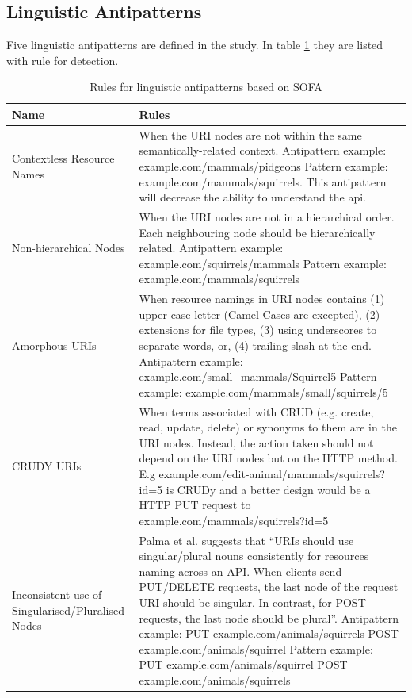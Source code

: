 \documentclass[a4paper,12pt]{article}
\begin{document}
\subsection{Linguistic Antipatterns}

Five linguistic antipatterns are defined in the study. In table \ref{tab:Rules for linguistic antipatterns} they are listed with rule for detection.
\begin{center}
\begin{table}[!ht]
\begin{tabular}{|p{30mm}|p{105mm}|}
\hline \textbf{Name} & \textbf{Rules} \\
\hline 
Contextless Resource Names &
When the URI nodes are not within the same semantically-related context. Antipattern example: 
example.com/mammals/pidgeons
Pattern example:
example.com/mammals/squirrels.
This antipattern will decrease the ability to understand the api.
\\ \hline
Non-hierarchical Nodes &
When the URI nodes are not in a hierarchical order. Each neighbouring node should be hierarchically related. Antipattern example: 
example.com/squirrels/mammals
Pattern example:
example.com/mammals/squirrels
\\ \hline
Amorphous URIs &
When resource namings in URI nodes contains (1) upper-case letter (Camel Cases are excepted), (2)  extensions for file types, (3) using underscores to separate words, or, (4) trailing-slash at the end. Antipattern example:
example.com/small\_mammals/Squirrel5
Pattern example:
example.com/mammals/small/squirrels/5
\\ \hline
CRUDY URIs &
When terms associated with CRUD (e.g. create, read, update, delete) or synonyms to them are in the URI nodes. Instead, the action taken should not depend on the URI nodes but on the HTTP method. E.g example.com/edit-animal/mammals/squirrels?id=5 is CRUDy and a better design would be a HTTP PUT request to example.com/mammals/squirrels?id=5
\\ \hline
Inconsistent use of Singularised/Pluralised Nodes &
Palma et al. \cite{linguistic} suggests that “URIs should use singular/plural nouns consistently for resources naming across an
API. When clients send PUT/DELETE requests, the last node of the request URI
should be singular. In contrast, for POST requests, the last node should be plural”.
Antipattern example:
PUT example.com/animals/squirrels
POST example.com/animals/squirrel
Pattern example:
PUT example.com/animals/squirrel
POST example.com/animals/squirrels
\\ \hline
\end{tabular}
    \caption{Rules for linguistic antipatterns based on SOFA \cite{sofaanti}}
    \label{tab:Rules for linguistic antipatterns}
\end{table}
\end{center}
\end{document}

